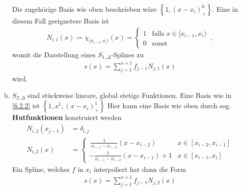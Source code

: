 \begin{Bspe}
\begin{enumerate}[a)]
    Die zugehörige Basis wie oben beschrieben wäre
    $\left\{ 1,(x-x_i)_+^0\right\}$.
    Eine in diesem Fall geeignetere Basis ist
    \begin{gather*}
      N_{i,1} (x)\coloneqq \chi_{[x_{i-1},x_i)}(x)
      = \begin{cases}
        1 & \text{falls } x\in[x_{i-1},x_i)\\
        0 & \text{sonst}
      \end{cases}\, ,
    \end{gather*}
    womit die Darstellung eines $S_{1,\Delta}$-Splines zu 
    \begin{gather*}
      s(x) = \sum_{j=1}^{n+1} f_{j-1} N_{j,1}(x)
    \end{gather*}
    wird.
  \item {} $S_{2,\Delta}$ 
    sind stückweise lineare, global stetige
    Funktionen. Eine Basis wie in \ref{6.2.2} ist
    $ \left\{1,x^1, (x-x_i)_+^1\right\}$
    \label{im6.2.4(2)}
    Hier kann eine Basis wie oben durch sog. 
    \textbf{Hutfunktionen}
    konstruiert werden
    \begin{align*}
      N_{i,2}(x_{j-1}) &= \delta_{i,j}\\
      N_{i,2}(x) &= \begin{cases}
        ~\frac{1}{x_{i-1}-x_{i-2}}(x-x_{i-2}) & x\in [x_{i-2}, x_{i-1}]\\
        -\frac{1}{x_{i-1}-x_{i-2}}(x-x_{i-1})+1 & x\in [x_{i-1}, x_i]
      \end{cases}
    \end{align*}
    \label{im6.2.4(3)}
    Ein Spline, welches $f$ in $x_i$ interpoliert hat dann die Form
    \begin{gather*}
      s(x) = \sum_{j=1}^{n+1}f_{j-1}N_{j,2}(x)
    \end{gather*}
  \end{enumerate}
\end{Bspe}


